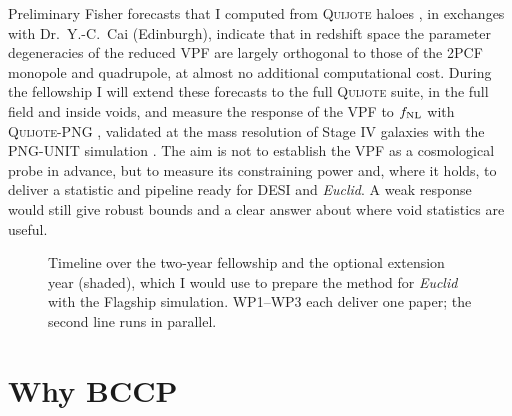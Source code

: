 \documentclass[11pt,a4paper]{article}
\begin{document}
Preliminary Fisher forecasts that I computed from \textsc{Quijote} haloes \citep{VillaescusaNavarro2020}, in exchanges with Dr.\ Y.-C.~Cai (Edinburgh), indicate that in redshift space the parameter degeneracies of the reduced VPF are largely orthogonal to those of the 2PCF monopole and quadrupole, at almost no additional computational cost. During the fellowship I will extend these forecasts to the full \textsc{Quijote} suite, in the full field and inside voids, and measure the response of the VPF to $f_{\rm NL}$ with \textsc{Quijote-PNG} \citep{Coulton2023a}, validated at the mass resolution of Stage IV galaxies with the PNG-UNIT simulation \citep{GutierrezAdame2024}. The aim is not to establish the VPF as a cosmological probe in advance, but to measure its constraining power and, where it holds, to deliver a statistic and pipeline ready for DESI and \textit{Euclid}. A weak response would still give robust bounds and a clear answer about where void statistics are useful.

\begin{figure}[h]
\centering
{}
\caption{Timeline over the two-year fellowship and the optional extension year (shaded), which I would use to prepare the method for \textit{Euclid} with the Flagship simulation. WP1--WP3 each deliver one paper; the second line runs in parallel.}
\label{fig:timeline}
\end{figure}

\section*{Why BCCP}
\end{document}

